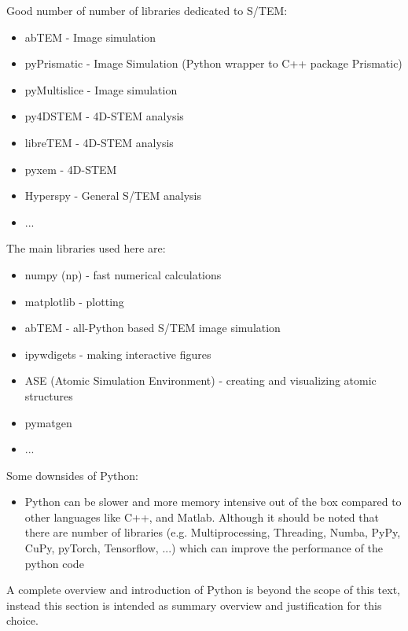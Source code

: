 \documentclass[%
 superscriptaddress,
 aip,
 amsmath,amssymb,
preprint,%
 author-year,%
longbibliography
]{revtex4-2}
\begin{document}
Good number of number of libraries dedicated to S/TEM:
\begin{itemize}
    \item abTEM - Image simulation
    \item pyPrismatic - Image Simulation (Python wrapper to C++ package Prismatic)
    \item pyMultislice - Image simulation 
    \item py4DSTEM - 4D-STEM analysis
    \item libreTEM - 4D-STEM analysis
    \item pyxem - 4D-STEM
    \item Hyperspy - General S/TEM analysis 
    \item ...
\end{itemize}

The main libraries used here are:
\begin{itemize}
    \item numpy (np) - fast numerical calculations
    \item matplotlib - plotting 
    \item abTEM - all-Python based S/TEM image simulation 
    \item ipywdigets - making interactive figures
    \item ASE (Atomic Simulation Environment) - creating and visualizing atomic structures   
    \item pymatgen
    \item ...
\end{itemize}

Some downsides of Python:

\begin{itemize}
    \item Python can be slower and more memory intensive out of the box compared to other languages like C++, and Matlab. Although it should be noted that there are number of libraries (e.g. Multiprocessing, Threading, Numba, PyPy, CuPy, pyTorch, Tensorflow, ...) which can improve the performance of the python code
\end{itemize}

A complete overview and introduction of Python is beyond the scope of this text, instead this section is intended as summary overview and justification for this choice. 
\end{document}
